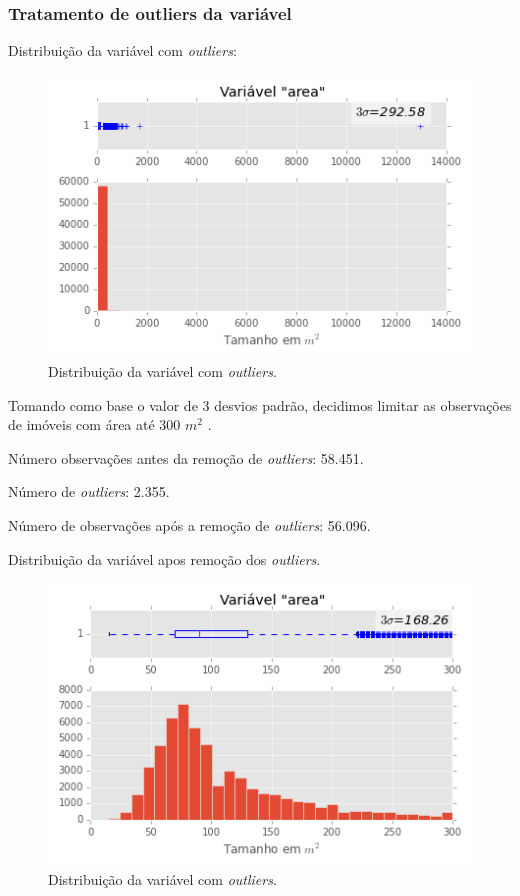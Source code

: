 \subsubsection{Tratamento de outliers da variável }

Distribuição da variável  com \textit{outliers}:


\begin{figure}[H]
\centering
\includegraphics[width=0.8\linewidth]{img/var_area_boxhist_antes}
\caption{Distribuição da variável  com \textit{outliers}.}
\label{fig:var_area_boxhist_antes}
\end{figure}

Tomando como base o valor de 3 desvios padrão, decidimos limitar as observações de imóveis com área até 300 $ m^2 $ . 

Número observações antes da remoção de \textit{outliers}: 58.451. 

Número de \textit{outliers}: 2.355.

Número de observações após a remoção de \textit{outliers}: 56.096.

Distribuição da variável  apos remoção dos \textit{outliers}.

\begin{figure}[H]
\centering
\includegraphics[width=0.8\linewidth]{img/var_area_boxhist_depois}
\caption{Distribuição da variável  com \textit{outliers}.}
\label{fig:var_area_boxhist_depois}
\end{figure}


